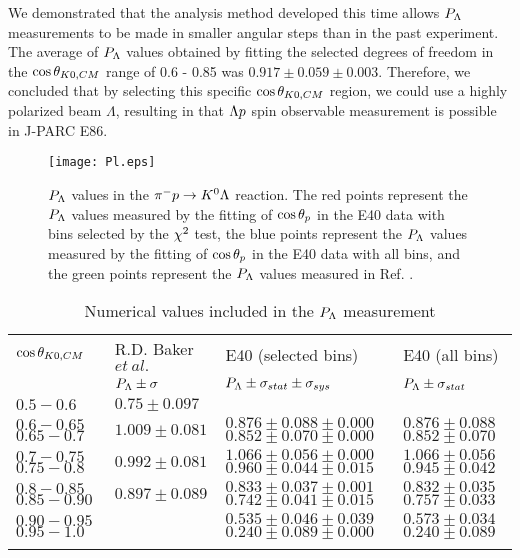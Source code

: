 We demonstrated that the analysis method developed this time allows $P_{\Lambda}$ measurements to be made in smaller angular steps than in the past experiment. The average of $P_{\Lambda}$ values obtained by fitting the selected degrees of freedom in the $\cos{\theta_{K0,CM}}$ range of 0.6 - 0.85 was $0.917\pm0.059\pm0.003$. Therefore, we concluded that by selecting this specific $\cos{\theta_{K0,CM}}$ region, we could use a highly polarized beam $\Lambda$, resulting in that $\Lambda p$ spin observable measurement is possible in J-PARC E86.

\begin{figure}[h]
  \centering
  \texttt{[image: Pl.eps]}
  \caption{$P_{\Lambda}$ values in the $\pi^- p \to K^0 \Lambda$ reaction. The red points represent the $P_{\Lambda}$ values measured by the fitting of $\cos{\theta_p}$ in the E40 data with bins selected by the $\chi^{2}$ test, the blue points represent the $P_{\Lambda}$ values measured by the fitting of $\cos{\theta_p}$ in the E40 data with all bins, and the green points represent the $P_{\Lambda}$ values measured in Ref. \cite{Baker}.}
  \label{fig-Pl}
\end{figure}


\begin{table}[!h] 
  \begin{center}
  \caption{Numerical values included in the $P_{\Lambda}$ measurement}
    \begin{tabular}%
    {m{2cm} m{3cm} m{4cm} m{3cm}}
    $\cos{\theta_{K0,CM}}$ & R.D. Baker $et\ al.$ & E40 (selected bins) & E40 (all bins) \\
     & $P_{\Lambda}\pm\sigma$ & $P_{\Lambda}\pm\sigma_{stat}\pm\sigma_{sys}$ & $P_{\Lambda}\pm\sigma_{stat}$ \\
    \midrule\midrule
    $0.5-0.6$ & $0.75\pm0.097$ & & \\
    \midrule
    $0.6-0.65$ $0.65-0.7$ & $1.009\pm0.081$ & $0.876\pm0.088\pm0.000$ $0.852\pm0.070\pm0.000$ & $0.876\pm0.088$ $0.852\pm0.070$ \\
    \midrule
    $0.7-0.75$ $0.75-0.8$ & $0.992\pm0.081$ & $1.066\pm0.056\pm0.000$ $0.960\pm0.044\pm0.015$ & $1.066\pm0.056$ $0.945\pm0.042$ \\
    \midrule
    $0.8-0.85$ $0.85-0.90$ & $0.897\pm0.089$ & $0.833\pm0.037\pm0.001$ $0.742\pm0.041\pm0.015$ & $0.832\pm0.035$ $0.757\pm0.033$ \\
    \midrule
    $0.90-0.95$ $0.95-1.0$ & & $0.535\pm0.046\pm0.039$ $0.240\pm0.089\pm0.000$ & $0.573\pm0.034$ $0.240\pm0.089$ \\
    \label{tab-Pl}
    \end{tabular}
  \end{center}
\end{table}


